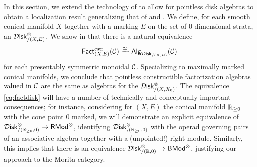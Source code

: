 \documentclass[10pt, reqno, twoside
, final
]{amsart}
\numberwithin{equation}{subsection}%
\theoremstyle{definition}
\theoremstyle{definition}
\theoremstyle{definition}
\theoremstyle{definition}
\theoremstyle{definition}
\theoremstyle{definition}
\theoremstyle{definition}
\theoremstyle{definition}
\theoremstyle{definition}
\theoremstyle{plain}
\theoremstyle{definition}
\theoremstyle{plain}
\theoremstyle{definition}
\theoremstyle{plain}
\theoremstyle{definition}
\theoremstyle{definition}
\theoremstyle{plain}
\theoremstyle{plain}
\theoremstyle{definition}
\theoremstyle{plain}
\theoremstyle{plain}
\theoremstyle{plain}
\begin{document}
In this section, we extend the technology of \cite{KS} to allow for pointless disk algebras to obtain a localization result generalizing that of \cite{KSW} and \cite{KS}. We define, for each smooth conical manifold $X$ together with a marking $E$ on the set of 0-dimensional strata, an \infop $\mathcal{D}\mathsf{isk}^{\otimes}_{/(X,E)}$. We  show in  that there is a natural equivalence
\begin{equation}\label{eq:factdisk}
    \mathsf{Fact}^{\mathrm{cstr}}_{(X,E)}(\mathcal{C}) \xrightarrow{\simeq}  \mathsf{Alg}_{\mathcal{D}\mathsf{isk}_{/(X,E)}}(\mathcal{C})  
\end{equation} 
for each presentably symmetric monoidal \infcat $\mathcal{C}$. Specializing to maximally marked conical manifolds, we conclude that pointless constructible factorization algebras valued in $\mathcal{C}$ are the same as algebras for the \infop $\mathcal{D}\mathsf{isk}^{\otimes}_{/(X,X_0)}$. The equivalence \eqref{eq:factdisk} will have a number of technically and conceptually important consequences; for instance, considering for $(X,E)$ the conical manifold $\mathbb{R}_{\geq0}$ with the cone point $0$ marked, we will demonstrate an explicit equivalence of \infops $\mathcal{D}\mathsf{isk}^{\otimes}_{/(\mathbb{R}_{\geq 0},0)}\rightarrow \mathsf{RMod}^{\otimes}$, identifying $\mathcal{D}\mathsf{isk}^{\otimes}_{/(\mathbb{R}_{\geq 0},0)}$ with the operad governing pairs of an associative algebra together with a (unpointed!) right module. Similarly, this implies that there is an equivalence $\mathcal{D}\mathsf{isk}^{\otimes}_{/(\mathbb{R},0)}\rightarrow \mathsf{BMod}^{\otimes}$, justifying our approach to the Morita category.
\end{document}
